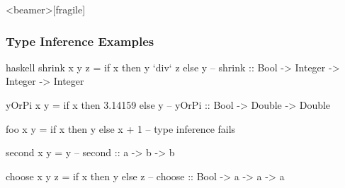 \documentclass[dvipsnames]{beamer}
\theoremstyle{plain}
\begin{document}
\begin{frame}<beamer>[fragile]
  \frametitle{Type Inference Examples}

  \begin{example}[Haskell]
    \begin{pygments}{haskell}
shrink x y z = if x then y `div` z else y
-- shrink :: Bool -> Integer -> Integer -> Integer

yOrPi x y = if x then 3.14159 else y
-- yOrPi :: Bool -> Double -> Double

foo x y = if x then y else x + 1
-- type inference fails

second x y = y
-- second :: a -> b -> b

choose x y z = if x then y else z
-- choose :: Bool -> a -> a -> a
    \end{pygments}
  \end{example}
\end{frame}
% 
% 
% 
\end{document}
